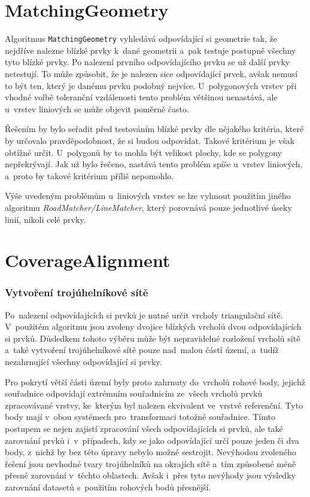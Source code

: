 \section{MatchingGeometry}
\label{problemy-mg}

Algoritmus \texttt{MatchingGeometry} vyhledává odpovídající si geometrie tak,
že nejdříve nalezne blízké prvky k~dané geometrii a~pak testuje postupně všechny
tyto blízké prvky. Po nalezení prvního odpovídajícího prvku se už další prvky
netestují. To může způsobit, že je nalezen sice odpovídající prvek, avšak
nemusí to být ten, který je danému prvku podobný nejvíce. U~polygonových vrstev
při vhodné volbě toleranční vzdálenosti tento problém většinou nenastává, 
ale u~vrstev liniových se může objevit poměrně často. 

Řešením by bylo seřadit před testováním blízké prvky dle nějakého
kritéria, které by určovalo pravděpodobnost, že si budou odpovídat. Takové
kritérium je však obtížné určit. U~polygonů by to mohla být velikost plochy,
kde se polygony nepřekrývají. Jak už bylo řečeno, nastává tento problém
spíše u~vrstev liniových, a~proto by takové kritérium příliš nepomohlo.


Výše uvedeným problémům u~liniových vrstev se lze vyhnout použitím jiného
algoritmu \textit{RoadMatcher/LineMatcher}, který porovnává pouze jednotlivé
úseky linií, nikoli celé prvky. 

\section{CoverageAlignment}
\label{problemy-ca}

\subsubsection{Vytvoření trojúhelníkové sítě}
Po~nalezení odpovídajících si prvků je nutné určit vrcholy triangulační sítě.
V~použitém algoritmu jsou zvoleny dvojice blízkých vrcholů dvou odpovídajících
si prvků. Důsledkem tohoto výběru může být nepravidelné rozložení vrcholů sítě
a~také vytvoření troj\-úhelníkové sítě pouze nad~malou částí území, a~tudíž 
nezahrnující všechny odpovídající si prvky.

Pro pokrytí větší části území byly proto zahrnuty do~vrcholů rohové body, jejichž
souřadnice odpovídají extrémním souřadnicím ze~všech vrcholů prvků zpracovávané 
vrstvy, ke~kterým byl nalezen ekvivalent ve~vrstvě referenční. Tyto body mají 
v~obou systémech pro~transformaci totožné souřadnice. Tímto postupem se nejen 
zajistí zpracování všech odpovídajících si prvků, ale také zarovnání prvků 
i~v~případech, kdy se jako odpovídající určí pouze jeden či dva body, z~nichž 
by bez této úpravy nebylo možné  sestrojit. Nevýhodou zvoleného řešení jsou 
nevhodné tvary trojúhelníků na okrajích sítě a~tím způsobené méně přesné zarovnání 
v~těchto oblastech. Avšak i~přes tyto nevýhody jsou výsledky zarovnání datasetů 
s~použitím rohových bodů přesnější. 

